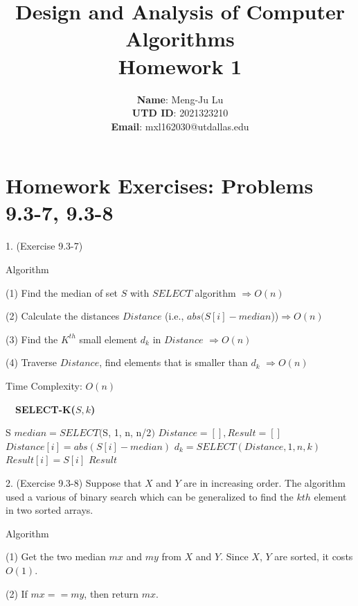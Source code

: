 \documentclass[a4paper,11pt,oneside]{book}
\begin{document}
\title{\textbf{Design and Analysis of Computer Algorithms} \\
\textbf{Homework 1}}
\author{\textbf{Name}: Meng-Ju Lu
\\ \textbf{UTD ID}: 2021323210
\\ \textbf{Email}: mxl162030@utdallas.edu}
\maketitle

\section*{Homework Exercises: Problems 9.3-7, 9.3-8}

1. (Exercise 9.3-7)

Algorithm

(1) Find the median of set $S$ with $SELECT$ algorithm $\Rightarrow O(n)$

(2) Calculate the distances $Distance$ (i.e., $abs(S[i] - median$))$\Rightarrow O(n)$

(3) Find the $K^{th}$ small element $d_k$ in $Distance$ $\Rightarrow O(n)$

(4) Traverse $Distance$, find elements that is smaller than $d_k$ $\Rightarrow O(n)$

Time Complexity: $O(n)$ 

%
\begin{algorithm*}[h]
\caption{\ \ \textbf{SELECT-K($S, k$)}}
\label{selectk}
\begin{algorithmic} [1]
    	\RETURN S
\ENDIF 
\STATE $median = SELECT($S, 1, n, n/2$)$ 
\STATE $Distance = [], Result = []$
    \STATE $Distance[i] = abs(S[i] - median)$
\ENDFOR
\STATE $d_k = SELECT(Distance, 1, n, k)$
    	\STATE $Result[i] = S[i]$
    \ENDIF 
\ENDFOR
\RETURN $Result$
\end{algorithmic}
\end{algorithm*}
%

2. (Exercise 9.3-8) Suppose that $X$ and $Y$ are in increasing order. The algorithm used a various of binary search which can be generalized to find the $kth$ element in two sorted arrays.

Algorithm

(1) Get the two median $mx$ and $my$ from $X$ and $Y$. Since $X$, $Y$ are sorted, it costs $O(1)$.

(2) If $mx == my$, then return $mx$. 
\end{document}
